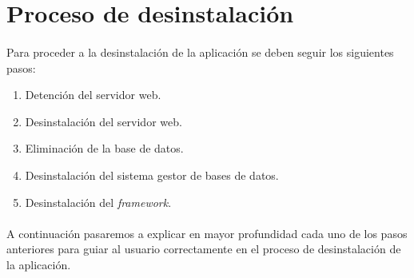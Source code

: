 \section{Proceso de desinstalación}

  \paragraph{}Para proceder a la desinstalación de la aplicación se deben seguir
  los siguientes pasos:

  \begin{enumerate}
   \item Detención del servidor web.
   \item Desinstalación del servidor web.
   \item Eliminación de la base de datos.
   \item Desinstalación del sistema gestor de bases de datos.
   \item Desinstalación del \textit{framework}.
  \end{enumerate}

  \paragraph{}A continuación pasaremos a explicar en mayor profundidad cada
  uno de los pasos anteriores para guiar al usuario correctamente en el proceso
  de desinstalación de la aplicación.

  \begin{enumerate}
    
    
    
    
    
  \end{enumerate}
